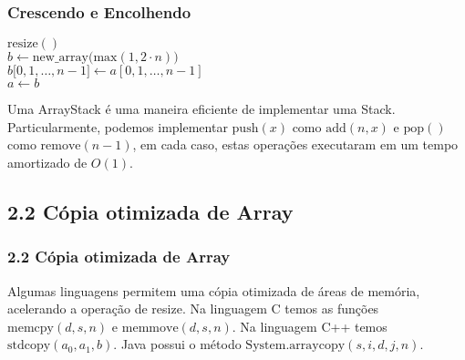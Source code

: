 \documentclass{beamer}
\begin{document}
\begin{frame}
\frametitle{Crescendo e Encolhendo}
\begin{oframed}
\begin{flushleft}
\hspace*{1em} $\ensuremath{\mathrm{resize}()}$\\
\hspace*{1em} \hspace*{1em} $\ensuremath{\ensuremath{\mathit{b}} \gets  \ensuremath{\mathrm{new\_array}(\mathrm{max}(1, 2\cdot \ensuremath{\mathit{n}})})}$\\
\hspace*{1em} \hspace*{1em} $\ensuremath{\ensuremath{\mathit{b}}[\ensuremath{0,1,\ldots,\ensuremath{\ensuremath{\mathit{n}}-1}]} \gets  \ensuremath{\ensuremath{\mathit{a}}[\ensuremath{0,1,\ldots,\ensuremath{\mathit{n}}-1}]}}$\\
\hspace*{1em} \hspace*{1em} $\ensuremath{\ensuremath{\mathit{a}} \gets  \ensuremath{b}}$\\
\end{flushleft}
\end{oframed}
\end{frame}

\begin{frame}

Uma ArrayStack é uma maneira eficiente de implementar uma Stack.
Particularmente, podemos implementar $\ensuremath{\ensuremath{\mathrm{push}(\ensuremath{\mathit{x}})}}$ como $\ensuremath{\ensuremath{\mathrm{add}(\ensuremath{\mathit{n}},\ensuremath{\mathit{x}})}}$ e $\ensuremath{\ensuremath{\mathrm{pop}()}}$
como  $\ensuremath{\ensuremath{\mathrm{remove}(\ensuremath{\mathit{n}}-1)}}$, em cada caso, estas operações executaram em um tempo amortizado de $O(1)$.

\end{frame}

\subsection{2.2 Cópia otimizada de Array}
\begin{frame}
\frametitle{2.2 Cópia otimizada de Array}

Algumas linguagens permitem uma cópia otimizada de áreas de memória, acelerando a operação de resize. Na linguagem C
temos as funções $\ensuremath{\ensuremath{\mathrm{memcpy}(\ensuremath{\mathit{d}},\ensuremath{\mathit{s}},\ensuremath{\mathit{n}})}}$ e $\ensuremath{\ensuremath{\mathrm{memmove}(\ensuremath{\mathit{d}},\ensuremath{\mathit{s}},\ensuremath{\mathit{n}})}}$. Na linguagem C++ temos $\ensuremath{\ensuremath{\mathrm{stdcopy}(\ensuremath{\mathit{a_0}},\ensuremath{\mathit{a_1}},\ensuremath{\mathit{b}})}}$.
Java possui o método $\ensuremath{\ensuremath{\mathrm{System}.\mathrm{arraycopy}(\ensuremath{\mathit{s}},\ensuremath{\mathit{i}},\ensuremath{\mathit{d}},\ensuremath{\mathit{j}},\ensuremath{\mathit{n}})}}$.

\end{frame}
\end{document}
